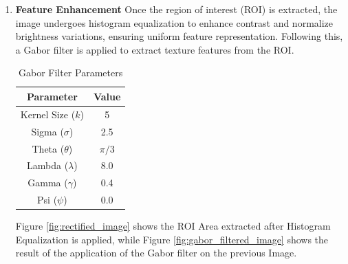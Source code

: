 \begin{enumerate}
    \item \textbf{Feature Enhancement}
    Once the region of interest (ROI) is extracted, the image undergoes histogram equalization to enhance contrast and normalize brightness variations, ensuring uniform feature representation. Following this, a Gabor filter is applied to extract texture features from the ROI.

    \begin{table}[h!]
        \centering
        \caption{Gabor Filter Parameters}
        \label{tab:gabor_params}
        \setlength{\tabcolsep}{4pt}
        \renewcommand{\arraystretch}{1.2}
        \begin{tabular}{|c|c|}
        \hline
        \textbf{Parameter} & \textbf{Value} \\ \hline
        Kernel Size ($k$)  & 5              \\ \hline
        Sigma ($\sigma$)   & 2.5            \\ \hline
        Theta ($\theta$)   & $\pi / 3$      \\ \hline
        Lambda ($\lambda$) & 8.0            \\ \hline
        Gamma ($\gamma$)   & 0.4            \\ \hline
        Psi ($\psi$)       & 0.0            \\ \hline
        \end{tabular}
    \end{table}
    
    Figure \ref{fig:rectified_image} shows the ROI Area extracted after Histogram Equalization is applied, while Figure \ref{fig:gabor_filtered_image} shows the result of the application of the Gabor filter on the previous Image.


\end{enumerate}

